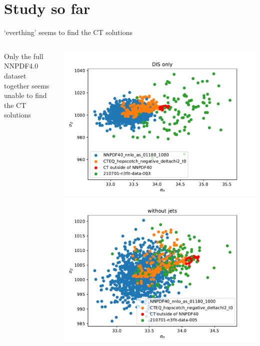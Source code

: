\documentclass[aspectratio=169,10pt]{beamer}
\begin{document}
\section{Study so far}

\begin{frame}[t]{`everthing' seems to find the CT solutions}
  \vspace*{-1.5em}
  \begin{columns}
    \begin{column}{.28\textwidth}
      Only the full NNPDF4.0 dataset together seems unable to find the CT solutions
    \end{column}
    \begin{column}{.7\textwidth}
      \centering
      \includegraphics[height=.45\textheight]{DIS_only.pdf}
      \includegraphics[height=.45\textheight]{without_jets.pdf}\\

\end{column}
\end{columns}
\end{frame}
\end{document}
